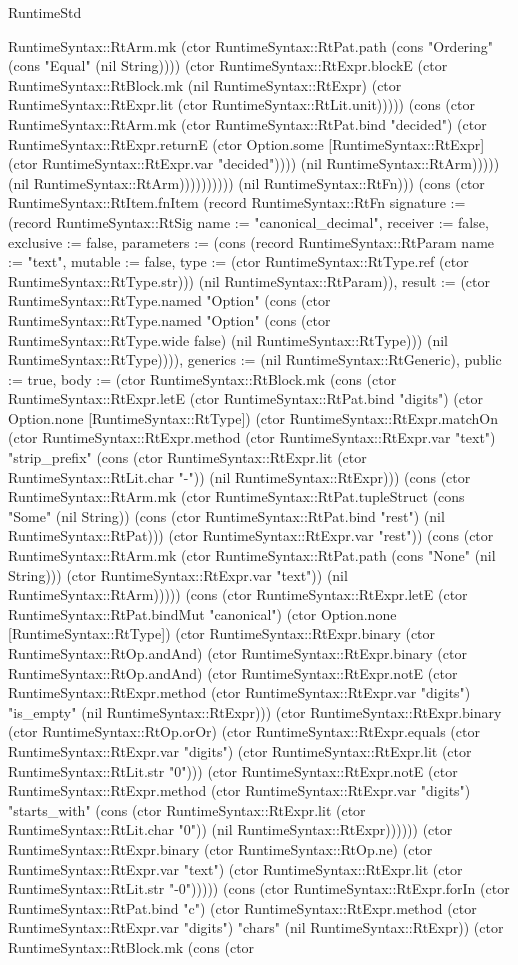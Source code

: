 \begin{lexlean}{RuntimeStd}
\begin{semanticmodule}
{RuntimeSyntax::RtArm.mk (ctor RuntimeSyntax::RtPat.path (cons "Ordering" (cons "Equal" (nil String)))) (ctor RuntimeSyntax::RtExpr.blockE (ctor RuntimeSyntax::RtBlock.mk (nil RuntimeSyntax::RtExpr) (ctor RuntimeSyntax::RtExpr.lit (ctor RuntimeSyntax::RtLit.unit))))) (cons (ctor RuntimeSyntax::RtArm.mk (ctor RuntimeSyntax::RtPat.bind "decided") (ctor RuntimeSyntax::RtExpr.returnE (ctor Option.some [RuntimeSyntax::RtExpr] (ctor RuntimeSyntax::RtExpr.var "decided")))) (nil RuntimeSyntax::RtArm))))) (nil RuntimeSyntax::RtArm)))))))))}) (nil RuntimeSyntax::RtFn))) (cons (ctor RuntimeSyntax::RtItem.fnItem (record RuntimeSyntax::RtFn {signature := (record RuntimeSyntax::RtSig {name := "canonical_decimal", receiver := false, exclusive := false, parameters := (cons (record RuntimeSyntax::RtParam {name := "text", mutable := false, type := (ctor RuntimeSyntax::RtType.ref (ctor RuntimeSyntax::RtType.str))}) (nil RuntimeSyntax::RtParam)), result := (ctor RuntimeSyntax::RtType.named "Option" (cons (ctor RuntimeSyntax::RtType.named "Option" (cons (ctor RuntimeSyntax::RtType.wide false) (nil RuntimeSyntax::RtType))) (nil RuntimeSyntax::RtType)))}), generics := (nil RuntimeSyntax::RtGeneric), public := true, body := (ctor RuntimeSyntax::RtBlock.mk (cons (ctor RuntimeSyntax::RtExpr.letE (ctor RuntimeSyntax::RtPat.bind "digits") (ctor Option.none [RuntimeSyntax::RtType]) (ctor RuntimeSyntax::RtExpr.matchOn (ctor RuntimeSyntax::RtExpr.method (ctor RuntimeSyntax::RtExpr.var "text") "strip_prefix" (cons (ctor RuntimeSyntax::RtExpr.lit (ctor RuntimeSyntax::RtLit.char "-")) (nil RuntimeSyntax::RtExpr))) (cons (ctor RuntimeSyntax::RtArm.mk (ctor RuntimeSyntax::RtPat.tupleStruct (cons "Some" (nil String)) (cons (ctor RuntimeSyntax::RtPat.bind "rest") (nil RuntimeSyntax::RtPat))) (ctor RuntimeSyntax::RtExpr.var "rest")) (cons (ctor RuntimeSyntax::RtArm.mk (ctor RuntimeSyntax::RtPat.path (cons "None" (nil String))) (ctor RuntimeSyntax::RtExpr.var "text")) (nil RuntimeSyntax::RtArm))))) (cons (ctor RuntimeSyntax::RtExpr.letE (ctor RuntimeSyntax::RtPat.bindMut "canonical") (ctor Option.none [RuntimeSyntax::RtType]) (ctor RuntimeSyntax::RtExpr.binary (ctor RuntimeSyntax::RtOp.andAnd) (ctor RuntimeSyntax::RtExpr.binary (ctor RuntimeSyntax::RtOp.andAnd) (ctor RuntimeSyntax::RtExpr.notE (ctor RuntimeSyntax::RtExpr.method (ctor RuntimeSyntax::RtExpr.var "digits") "is_empty" (nil RuntimeSyntax::RtExpr))) (ctor RuntimeSyntax::RtExpr.binary (ctor RuntimeSyntax::RtOp.orOr) (ctor RuntimeSyntax::RtExpr.equals (ctor RuntimeSyntax::RtExpr.var "digits") (ctor RuntimeSyntax::RtExpr.lit (ctor RuntimeSyntax::RtLit.str "0"))) (ctor RuntimeSyntax::RtExpr.notE (ctor RuntimeSyntax::RtExpr.method (ctor RuntimeSyntax::RtExpr.var "digits") "starts_with" (cons (ctor RuntimeSyntax::RtExpr.lit (ctor RuntimeSyntax::RtLit.char "0")) (nil RuntimeSyntax::RtExpr)))))) (ctor RuntimeSyntax::RtExpr.binary (ctor RuntimeSyntax::RtOp.ne) (ctor RuntimeSyntax::RtExpr.var "text") (ctor RuntimeSyntax::RtExpr.lit (ctor RuntimeSyntax::RtLit.str "-0"))))) (cons (ctor RuntimeSyntax::RtExpr.forIn (ctor RuntimeSyntax::RtPat.bind "c") (ctor RuntimeSyntax::RtExpr.method (ctor RuntimeSyntax::RtExpr.var "digits") "chars" (nil RuntimeSyntax::RtExpr)) (ctor RuntimeSyntax::RtBlock.mk (cons (ctor }
\end{semanticmodule}
\end{lexlean}
